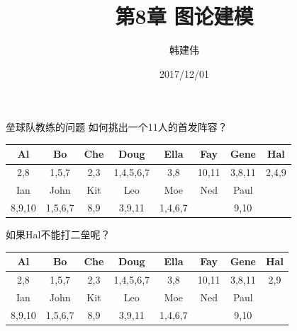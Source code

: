 \documentclass[UTF8]{ctexbeamer}
\title{第8章 图论建模}
\author{韩建伟}
\institute{
  信息学院\\
  \texttt{mm@hanjianwei.com}
}
\date{2017/12/01}
\begin{document}
\begin{frame}[plain]
  \titlepage{}
\end{frame}

\begin{frame}{垒球队教练的问题}
  如何挑出一个11人的首发阵容？

  \begin{table}
    \centering
    \begin{tabular}{c|c|c|c|c|c|c|c}
      \hline
      Al & Bo & Che & Doug & Ella & Fay & Gene & Hal\\
      \hline
      2,8 & 1,5,7 & 2,3 & 1,4,5,6,7 & 3,8 & 10,11 & 3,8,11 & 2,4,9\\
      \hline
      Ian & John & Kit & Leo & Moe & Ned & Paul & \\
      \hline
      8,9,10 & 1,5,6,7 & 8,9 & 3,9,11 & 1,4,6,7 && 9,10 &\\
      \hline
    \end{tabular}
  \end{table}

  如果Hal不能打二垒呢？

  \begin{table}
    \centering
    \begin{tabular}{c|c|c|c|c|c|c|c}
      \hline
      Al & Bo & Che & Doug & Ella & Fay & Gene & Hal\\
      \hline
      2,8 & 1,5,7 & 2,3 & 1,4,5,6,7 & 3,8 & 10,11 & 3,8,11 & 2,9\\
      \hline
      Ian & John & Kit & Leo & Moe & Ned & Paul & \\
      \hline
      8,9,10 & 1,5,6,7 & 8,9 & 3,9,11 & 1,4,6,7 && 9,10 &\\
      \hline
    \end{tabular}
  \end{table}
  
\end{frame}
\end{document}
